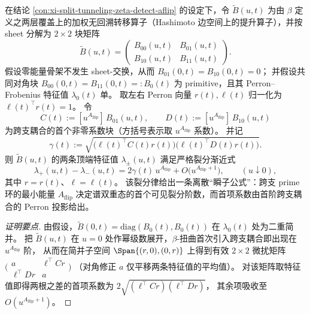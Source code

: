 \begin{conclusion}\label{con:xi-split-tunneling-perron-doublet-splitting-law}
在结论 \ref{con:xi-split-tunneling-zeta-detect-aflip} 的设定下，令 \(\widetilde B(u,t)\) 为由 \(\beta\) 定义之两层覆盖上的加权无回溯转移算子（Hashimoto 边空间上的提升算子），并按 sheet 分解为 \(2\times2\) 块矩阵
\[
\widetilde B(u,t)=
\begin{pmatrix}
B_{00}(u,t) & B_{01}(u,t)\\
B_{10}(u,t) & B_{11}(u,t)
\end{pmatrix}.
\]
假设零能量骨架不发生 sheet-交换，从而 \(B_{01}(0,t)=B_{10}(0,t)=0\)；
并假设共同对角块
\(
B_{00}(0,t)=B_{11}(0,t)=:B_{0}(t)
\)
为 primitive，且其 Perron--Frobenius 特征值 \(\lambda_{0}(t)\) 单。
取左右 Perron 向量 \(r(t),\ell(t)\) 归一化为 \(\ell(t)^{\!\top}r(t)=1\)。
令
\[
C(t):=[u^{A_{\mathrm{flip}}}]\,B_{01}(u,t),
\qquad
D(t):=[u^{A_{\mathrm{flip}}}]\,B_{10}(u,t)
\]
为跨支耦合的首个非零系数块（方括号表示取 \(u^{A_{\mathrm{flip}}}\) 系数）。
并记
\[
\gamma(t):=\sqrt{\bigl(\ell(t)^{\!\top}C(t)r(t)\bigr)\bigl(\ell(t)^{\!\top}D(t)r(t)\bigr)}.
\]
则 \(\widetilde B(u,t)\) 的两条顶端特征值 \(\lambda_{\pm}(u,t)\) 满足严格裂分渐近式
\[
\lambda_{+}(u,t)-\lambda_{-}(u,t)
=2\gamma(t)\,u^{A_{\mathrm{flip}}}+O\bigl(u^{A_{\mathrm{flip}}+1}\bigr),
\qquad (u\downarrow 0),
\]
其中 \(r=r(t)\)、\(\ell=\ell(t)\)。
该裂分律给出一条离散“瞬子公式”：跨支 prime 环的最小能量 \(A_{\mathrm{flip}}\) 决定谱双重态的首个可见裂分阶数，而首项系数由首阶跨支耦合的 Perron 投影给出。
\end{conclusion}
\begin{proof}[证明要点]
由假设，\(\widetilde B(0,t)=\mathrm{diag}(B_0(t),B_0(t))\) 在 \(\lambda_0(t)\) 处为二重简并。
把 \(\widetilde B(u,t)\) 在 \(u=0\) 处作幂级数展开，\(\beta\)-扭曲首次引入跨支耦合即出现在 \(u^{A_{\mathrm{flip}}}\) 阶，
从而在简并子空间 \(\Span\{(r,0),(0,r)\}\) 上得到有效 \(2\times2\) 微扰矩阵
\(
\bigl(\begin{smallmatrix} a & \ell^{\!\top}Cr\\ \ell^{\!\top}Dr & a\end{smallmatrix}\bigr)
\)
（对角修正 \(a\) 仅平移两条特征值的平均值）。
对该矩阵取特征值即得两根之差的首项系数为
\(
2\sqrt{(\ell^{\!\top}Cr)(\ell^{\!\top}Dr)}
\)，
其余项吸收至 \(O(u^{A_{\mathrm{flip}}+1})\)。
\end{proof}

